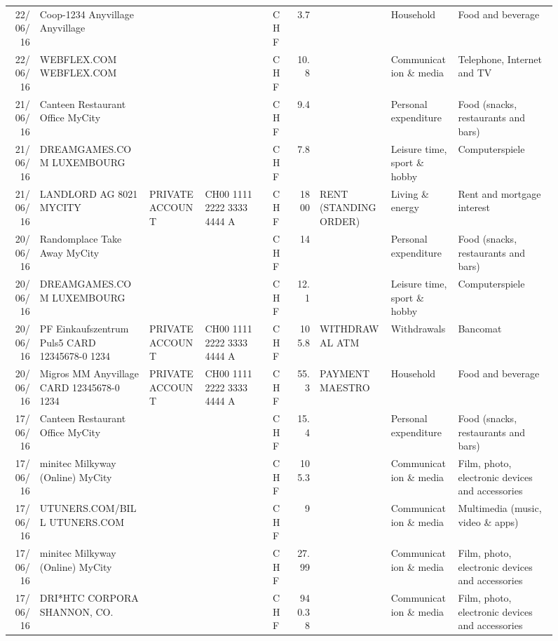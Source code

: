 \begin{landscape}
\begin{sidewaysfigure}
\begin{table}[h]
\begin{center}
\begin{tabular}{rllllrlll}
		22/06/16 & Coop-1234 Anyvillage    Anyvillage &       &       & CHF   & 3.7   &       & Household & Food and beverage \\
		22/06/16 & WEBFLEX.COM              WEBFLEX.COM &       &       & CHF   & 10.8  &       & Communication \& media & Telephone,  Internet and TV \\
		21/06/16 & Canteen Restaurant Office      MyCity &       &       & CHF   & 9.4   &       & Personal expenditure & Food (snacks, restaurants and bars) \\
		21/06/16 & DREAMGAMES.COM           LUXEMBOURG &       &       & CHF   & 7.8   &       & Leisure time, sport \& hobby & Computerspiele \\
		21/06/16 & LANDLORD AG 8021 MYCITY & PRIVATE ACCOUNT & CH00 1111 2222 3333 4444 A & CHF   & 1800  & RENT (STANDING ORDER) & Living \& energy & Rent and mortgage interest \\
		20/06/16 & Randomplace Take Away     MyCity &       &       & CHF   & 14    &       & Personal expenditure & Food (snacks, restaurants and bars) \\
		20/06/16 & DREAMGAMES.COM           LUXEMBOURG &       &       & CHF   & 12.1  &       & Leisure time, sport \& hobby & Computerspiele \\
		20/06/16 & PF Einkaufszentrum Puls5 CARD 12345678-0 1234 & PRIVATE ACCOUNT & CH00 1111 2222 3333 4444 A & CHF   & 105.8 & WITHDRAWAL ATM & Withdrawals & Bancomat \\
		20/06/16 & Migros MM Anyvillage CARD 12345678-0 1234 & PRIVATE ACCOUNT & CH00 1111 2222 3333 4444 A & CHF   & 55.3  & PAYMENT MAESTRO & Household & Food and beverage \\
		17/06/16 & Canteen Restaurant Office      MyCity &       &       & CHF   & 15.4  &       & Personal expenditure & Food (snacks, restaurants and bars) \\
		17/06/16 & minitec Milkyway (Online) MyCity &       &       & CHF   & 105.3 &       & Communication \& media & Film, photo, electronic devices and accessories \\
		17/06/16 & UTUNERS.COM/BILL          UTUNERS.COM &       &       & CHF   & 9     &       & Communication \& media & Multimedia (music, video \& apps) \\
		17/06/16 & minitec Milkyway (Online) MyCity &       &       & CHF   & 27.99 &       & Communication \& media & Film, photo, electronic devices and accessories \\
		17/06/16 & DRI*HTC CORPORA          SHANNON, CO. &       &       & CHF   & 940.38 &       & Communication \& media & Film, photo, electronic devices and accessories \\

\end{tabular}
\end{center}
\end{table}
\end{sidewaysfigure}
\end{landscape}
